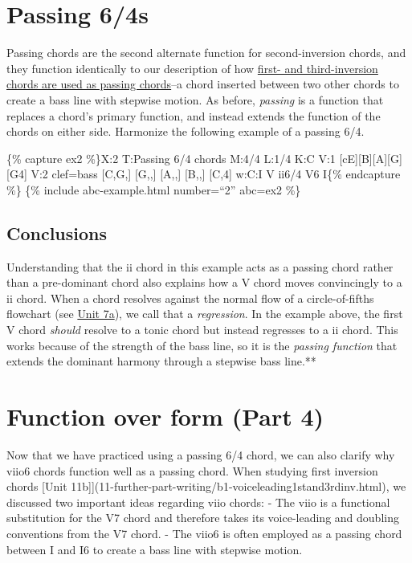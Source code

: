 \documentclass{book}
\begin{document}
\hypertarget{passing-64s}{%
\section{Passing 6/4s}\label{passing-64s}}

Passing chords are the second alternate function for second-inversion chords,
and they function identically to our description of how
\href{11-further-part-writing/b1-voiceleading1stand3rdinv.html}{first- and
third-inversion chords are used as passing chords}--a chord inserted between
two other chords to create a bass line with stepwise motion. As before,
\emph{passing} is a function that replaces a chord's primary function, and
instead extends the function of the chords on either side. Harmonize the
following example of a passing 6/4.

\{\% capture ex2 \%\}X:2 T:Passing 6/4 chords M:4/4 L:1/4 K:C V:1
{[}cE{]}{[}B{]}{[}A{]}{[}G{]}\textbar{} {[}G4{]}\textbar{]} V:2 clef=bass
{[}C,G,{]} {[}G,,{]} {[}A,,{]} {[}B,,{]}\textbar{} {[}C,4{]}\textbar{]} w:C:I
V ii6/4 V6 I\{\% endcapture \%\} \{\% include abc-example.html number=``2''
abc=ex2 \%\}

\hypertarget{conclusions-69}{%
\subsection{Conclusions}\label{conclusions-69}}

Understanding that the ii chord in this example acts as a passing chord rather
than a pre-dominant chord also explains how a V chord moves convincingly to a
ii chord. When a chord resolves against the normal flow of a circle-of-fifths
flowchart (see \href{07-harmonic-functions/a1-diaprogcirclefifths.html}{Unit
7a}), we call that a \emph{regression}. In the example above, the first V
chord \emph{should} resolve to a tonic chord but instead regresses to a ii
chord. This works because of the strength of the bass line, so it is the
\emph{passing function} that extends the dominant harmony through a stepwise
bass line.**

\hypertarget{function-over-form-part-4}{%
\section{Function over form (Part 4)}\label{function-over-form-part-4}}

Now that we have practiced using a passing 6/4 chord, we can also clarify why
viio6 chords function well as a passing chord. When studying first inversion
chords {[}Unit
11b{]}{]}(11-further-part-writing/b1-voiceleading1stand3rdinv.html), we
discussed two important ideas regarding viio chords: - The viio is a
functional substitution for the V7 chord and therefore takes its voice-leading
and doubling conventions from the V7 chord. - The viio6 is often employed as a
passing chord between I and I6 to create a bass line with stepwise motion.
\end{document}
